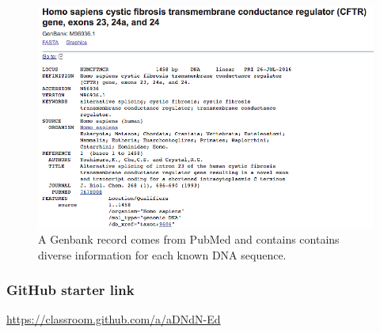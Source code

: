 

\long{}



\flushleft

\begin{figure}[ht!]
	\begin{center}
	 \includegraphics[scale=.4]{graphics/genbank.png}
	\end{center}
	\caption{A Genbank record comes from PubMed and contains contains diverse information for each known DNA sequence.}
	\label{fig:genbank}
\end{figure}


\vspace*{-.1in}
\subsubsection*{GitHub starter link}
\vspace*{-.1in}

\begin{center}
\color{red} \url{https://classroom.github.com/a/aDNdN-Ed} \color{black}
\end{center}


